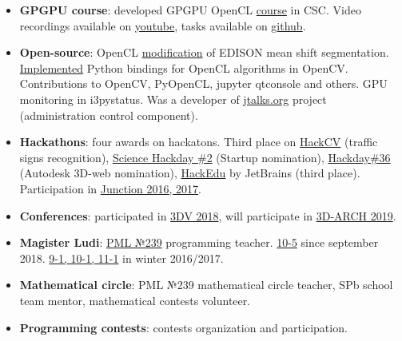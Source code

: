 \documentclass[11pt,oneside]{article}
\newcommand{\hhref}[2]{\href{#1}{\color{blue}#2}}
\begin{document}
\begin{itemize}
    \item{\textbf{GPGPU course}}: developed GPGPU OpenCL \hhref{https://compscicenter.ru/courses/video_cards_computation/2018-autumn/classes/}{course} in CSC. Video recordings available on \hhref{https://www.youtube.com/watch?v=L79PgDOcVfw&list=PLlb7e2G7aSpTgwAm0GBkvn5XA0NokovJJ}{youtube}, tasks available on \hhref{https://github.com/GPGPUCourse2018}{github}.

    \item{\textbf{Open-source}: OpenCL \hhref{https://github.com/PolarNick239/OpenMeanShift}{modification} of EDISON mean shift segmentation. \hhref{https://github.com/opencv/opencv/pull/6078}{Implemented} Python bindings for OpenCL algorithms in OpenCV. Contributions to OpenCV, PyOpenCL, jupyter qtconsole and others. GPU monitoring in i3pystatus. Was a developer of \hhref{http://jtalks.org/}{jtalks.org} project (administration control component)}.

    \item{\textbf{Hackathons}}: four awards on hackatons. Third place on \hhref{https://career.luxoft.com/lp/hack-cv/}{HackCV} (traffic signs recognition), \hhref{http://hackday.ru/sciencehackday-2/projects\#project-1400}{Science Hackday \#2} (Startup nomination), \hhref{http://hackday.ru/hackday-36/projects\#project-1121}{Hackday\#36} (Autodesk 3D-web nomination), \hhref{https://www.hackerleague.org/hackathons/jetbrains-edtech-hackathon/blogposts/53655896e24d32cfbd000006}{HackEdu} by JetBrains (third place). Participation in \hhref{http://www.hackjunction.com/}{Junction 2016, 2017}.

    \item{\textbf{Conferences}}: participated in \hhref{http://3dv18.uniud.it/}{3DV 2018}, will participate in \hhref{http://www.3d-arch.org/}{3D-ARCH 2019}.

    \item{\textbf{Magister Ludi}}: \hhref{http://239.ru}{PML №239} programming teacher. \hhref{http://polarnick.com/blogs/239/2018/index_ru.html}{10-5} since september 2018. \hhref{http://polarnick239.github.io/239/201612}{9-1, 10-1, 11-1} in winter 2016/2017.

    \item{\textbf{Mathematical circle}}: PML №239 mathematical circle teacher, SPb school team mentor, mathematical contests volunteer.

    \item{\textbf{Programming contests}}: contests organization and participation.
\end{itemize}
\end{document}
